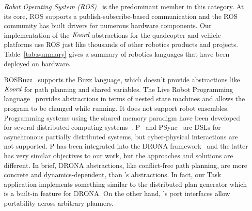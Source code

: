 %
{\em Robot Operating System (ROS)\/}~\cite{ros} is the predominant member in this category. At its core, ROS supports a publish-subscribe-based communication  and the ROS community has built drivers for  numerous hardware components.
Our implementation of the $\emph{Koord}$ abstractions for the quadcopter and vehicle platforms use ROS just like thousands of other robotics products and  projects.
  Table~\ref{tab:summary} gives a summary of robotics languages that have been deployed on hardware.

 ROSBuzz~\cite{ROSBuzz} supports the Buzz language, which doesn't provide abstractions like $\emph{Koord}$ for path planning and shared variables. The Live Robot Programming language~\cite{campusanofabry:lrp2016} provides abstractions in terms of nested state machines and allows the program to be changed while running. It does not support robot ensembles. Programming systems using the shared memory paradigm have been developed for several distributed computing systems~\cite{dsm1991,Adve96sharedmemory,Azure,Cassandra,Dynamo}. P~\cite{Planguage} and PSync~\cite{PSyncLanguage} are DSLs for asynchronous partially distributed systems, but cyber-physical interactions are not supported. P has been integrated into the DRONA framework~\cite{desai2017drona} and the latter has very similar objectives to our work, but the approaches and solutions are different. 
 In brief, DRONA abstractions, like conflict-free path planning, are more concrete and dynamics-dependent, than \lgname's abstractions. In fact, our Task application implements something similar to the distributed plan generator which is a built-in feature for DRONA. On the other hand, \lgname's port interfaces allow portability across arbitrary planners.

